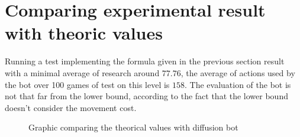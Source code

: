 \documentclass{article}
\begin{document}
\section{Comparing experimental result with theoric values}
Running a test implementing the formula given in the previous section result
with a minimal average of research around $77.76$, the average of actions used
by the bot over 100 games of test on this level is $158$. The evaluation of the
bot is not that far from the lower bound, according to the fact that the lower
bound doesn't consider the movement cost.
\begin{figure}[H]
	\caption{\label{fig:compare} Graphic comparing the theorical values with diffusion bot}
\end{figure}
\end{document}
